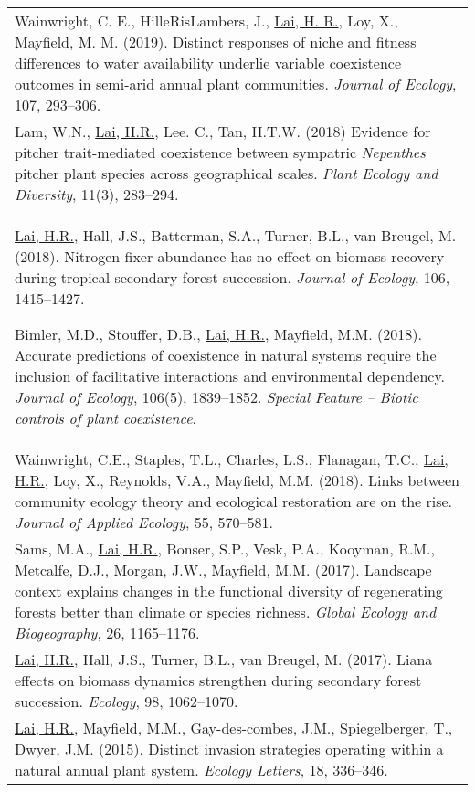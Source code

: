 \documentclass[a4paper]{article}
\begin{document}
\begin{tabular}{p{\linewidth}}
\hangindent=1cm Wainwright, C. E., HilleRisLambers, J., \underline{Lai, H. R.}, Loy, X., Mayfield, M. M. (2019). Distinct responses of niche and fitness differences to water availability underlie variable coexistence outcomes in semi-arid annual plant communities. \textit{Journal of Ecology}, 107, 293--306.\\

\hangindent=1cm Lam, W.N., \underline{Lai, H.R.}, Lee. C., Tan, H.T.W. (2018) Evidence for pitcher trait-mediated coexistence between sympatric \textit{Nepenthes} pitcher plant species across geographical scales. \textit{Plant Ecology and Diversity}, 11(3), 283--294.\\

\hangindent=1cm \underline{Lai, H.R.}, Hall, J.S., Batterman, S.A., Turner, B.L., van Breugel, M. (2018). Nitrogen fixer abundance has no effect on biomass recovery during tropical secondary forest succession. \textit{Journal of Ecology}, 106, 1415--1427.

\hangindent=1cm Bimler, M.D., Stouffer, D.B., \underline{Lai, H.R.}, Mayfield, M.M. (2018). Accurate predictions of coexistence in natural systems require the inclusion of facilitative interactions and environmental dependency. \textit{Journal of Ecology}, 106(5), 1839--1852. \textit{Special Feature -- Biotic controls of plant coexistence}.\\

\hangindent=1cm Wainwright, C.E., Staples, T.L., Charles, L.S., Flanagan, T.C., \underline{Lai, H.R.}, Loy, X., Reynolds, V.A., Mayfield, M.M. (2018). Links between community ecology theory and ecological restoration are on the rise. \textit{Journal of Applied Ecology}, 55, 570--581.\\

\hangindent=1cm Sams, M.A., \underline{Lai, H.R.}, Bonser, S.P., Vesk, P.A., Kooyman, R.M., Metcalfe, D.J., Morgan, J.W., Mayfield, M.M. (2017). Landscape context explains changes in the functional diversity of regenerating forests better than climate or species richness. \textit{Global Ecology and Biogeography}, 26, 1165--1176. \\

\hangindent=1cm \underline{Lai, H.R.}, Hall, J.S., Turner, B.L., van Breugel, M. (2017). Liana effects on biomass dynamics strengthen during secondary forest succession. \textit{Ecology}, 98, 1062--1070. \\

\hangindent=1cm \underline{Lai, H.R.}, Mayfield, M.M., Gay-des-combes, J.M., Spiegelberger, T., Dwyer, J.M. (2015). Distinct invasion strategies operating within a natural annual plant system. \textit{Ecology Letters}, 18, 336--346. \\

\end{tabular}
\end{document}
